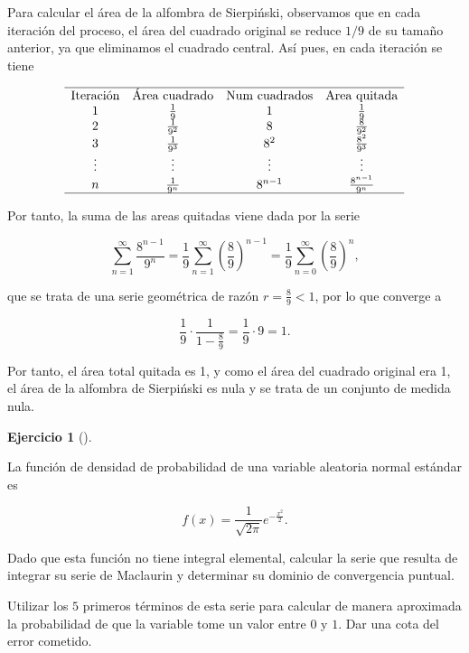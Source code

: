 \documentclass[
  spanish,
  a4paper,
]{scrreport}
\theoremstyle{definition}
\newtheorem{exercise}{Ejercicio}[chapter]
\theoremstyle{remark}
\begin{document}
\begin{tcolorbox}[enhanced jigsaw, colbacktitle=quarto-callout-tip-color!10!white, opacityback=0, toptitle=1mm, title=\textcolor{quarto-callout-tip-color}{\faLightbulb}\hspace{0.5em}{Solución}, coltitle=black, opacitybacktitle=0.6, breakable, toprule=.15mm, leftrule=.75mm, titlerule=0mm, colframe=quarto-callout-tip-color-frame, left=2mm, bottomrule=.15mm, bottomtitle=1mm, arc=.35mm, rightrule=.15mm, colback=white]

Para calcular el área de la alfombra de Sierpiński, observamos que en
cada iteración del proceso, el área del cuadrado original se reduce
\(1/9\) de su tamaño anterior, ya que eliminamos el cuadrado central.
Así pues, en cada iteración se tiene

\[
\begin{array}{cccc}
\hline
\mbox{Iteración} & \mbox{Área cuadrado} & \mbox{Num cuadrados} & \mbox{Area quitada} \\
1 & \frac{1}{9} & 1 & \frac{1}{9} \\
2 & \frac{1}{9^2} & 8 & \frac{8}{9^2} \\
3 & \frac{1}{9^3} & 8^2 & \frac{8^2}{9^3} \\
\vdots & \vdots & \vdots & \vdots \\
n & \frac{1}{9^n} & 8^{n-1} & \frac{8^{n-1}}{9^n} \\
\hline
\end{array}
\]

Por tanto, la suma de las areas quitadas viene dada por la serie

\[
\sum_{n=1}^\infty \frac{8^{n-1}}{9^n} 
= \frac{1}{9}\sum_{n=1}^\infty \left(\frac{8}{9}\right)^{n-1}
= \frac{1}{9}\sum_{n=0}^\infty \left(\frac{8}{9}\right)^n,
\]

que se trata de una serie geométrica de razón \(r = \frac{8}{9} < 1\),
por lo que converge a

\[
\frac{1}{9} \cdot \frac{1}{1 - \frac{8}{9}} = \frac{1}{9} \cdot 9 = 1.
\]

Por tanto, el área total quitada es 1, y como el área del cuadrado
original era 1, el área de la alfombra de Sierpiński es nula y se trata
de un conjunto de medida nula.

\end{tcolorbox}

\begin{exercise}[]\protect\hypertarget{exr-6}{}\label{exr-6}

La función de densidad de probabilidad de una variable aleatoria normal
estándar es

\[
f(x) = \frac{1}{\sqrt{2\pi}}e^{-\frac{x^2}{2}}.
\]

Dado que esta función no tiene integral elemental, calcular la serie que
resulta de integrar su serie de Maclaurin y determinar su dominio de
convergencia puntual.

Utilizar los \(5\) primeros términos de esta serie para calcular de
manera aproximada la probabilidad de que la variable tome un valor entre
\(0\) y \(1\). Dar una cota del error cometido.

\end{exercise}
\end{document}
